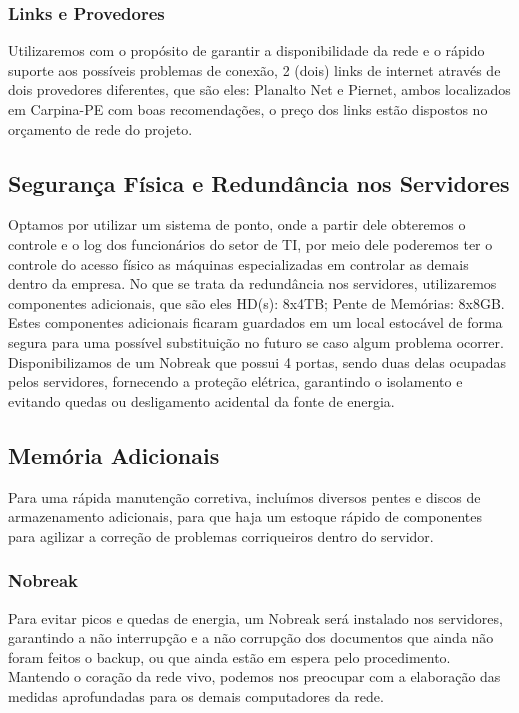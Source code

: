 \documentclass[12pt]{article}
\begin{document}
\subsubsection{Links e Provedores}
Utilizaremos com o propósito de garantir a disponibilidade da rede e o rápido suporte aos possíveis problemas de conexão, 2 (dois) links de internet através de dois provedores diferentes, que são eles: Planalto Net e Piernet, ambos localizados em Carpina-PE com boas recomendações, o preço dos links estão dispostos no orçamento de rede do projeto.

\subsection{Segurança Física e Redundância nos Servidores}
Optamos por utilizar um sistema de ponto, onde a partir dele obteremos o controle e o log dos funcionários do setor de TI, por meio dele poderemos ter o controle do acesso físico as máquinas especializadas em controlar as demais dentro da empresa. No que se trata da redundância nos servidores, utilizaremos componentes adicionais, que são eles HD(s): 8x4TB; Pente de Memórias: 8x8GB. Estes componentes adicionais ficaram guardados em um local estocável de forma segura para uma possível substituição no futuro se caso algum problema ocorrer. Disponibilizamos de um Nobreak que possui 4 portas, sendo duas delas ocupadas pelos servidores, fornecendo a proteção elétrica, garantindo o isolamento e evitando quedas ou desligamento acidental da fonte de energia.

\subsection{Memória Adicionais}
Para uma rápida manutenção corretiva, incluímos diversos pentes e discos de armazenamento adicionais, para que haja um estoque rápido de componentes para agilizar a correção de problemas corriqueiros dentro do servidor.

\subsubsection{Nobreak}
Para evitar picos e quedas de energia, um Nobreak será instalado nos servidores, garantindo a não interrupção e a não corrupção dos documentos que ainda não foram feitos o backup, ou que ainda estão em espera pelo procedimento. Mantendo o coração da rede vivo, podemos nos preocupar com a elaboração das medidas aprofundadas para os demais computadores da rede.
\end{document}
